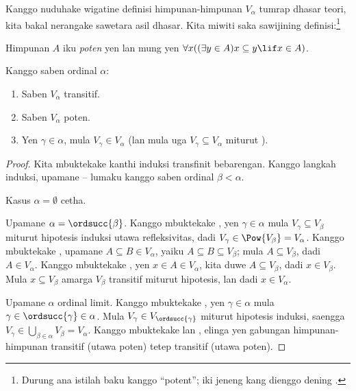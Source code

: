 \documentclass[../../../include/open-logic-section]{subfiles}
\begin{document}

Kanggo nuduhake wigatine definisi himpunan-himpunan
$V_\alpha$ tumrap dhasar teori, kita bakal nerangake
sawetara asil dhasar. Kita miwiti saka sawijining
definisi:\footnote{Durung ana istilah baku kanggo
``potent''; iki jeneng kang dienggo dening
\citet{ButtonLT1}.}
\begin{defn}
	Himpunan $A$ iku \emph{poten} yen lan mung yen
	$\forall x((\exists y \in A)x \subseteq y \lif x \in A)$.
\end{defn}
\begin{lem}
Kanggo saben ordinal $\alpha$:
\begin{enumerate}
	\item{} Saben $V_\alpha$ transitif.
	\item{} Saben $V_\alpha$ poten.
	\item{} Yen $\gamma \in \alpha$,
	mula $V_\gamma \in V_\alpha$ (lan mula uga
	$V_\gamma \subseteq V_\alpha$ miturut
	).
\end{enumerate}
\end{lem}

\begin{proof}
Kita mbuktekake kanthi induksi transfinit bebarengan.
Kanggo langkah induksi, upamane
-- lumaku
kanggo saben ordinal $\beta < \alpha$.

Kasus $\alpha = \emptyset$ cetha.

Upamane $\alpha = \ordsucc{\beta}$. Kanggo mbuktekake
, yen $\gamma \in \alpha$
mula $V_\gamma \subseteq V_\beta$ miturut
hipotesis induksi utawa refleksivitas, dadi
$V_\gamma \in \Pow{V_\beta} = V_\alpha$.
Kanggo mbuktekake , upamane
$A \subseteq B \in V_\alpha$, yaiku
$A \subseteq B \subseteq V_\beta$; mula
$A \subseteq V_\beta$, dadi $A \in V_\alpha$.
Kanggo mbuktekake , yen
$x \in A \in V_\alpha$, kita duwe
$A \subseteq V_\beta$, dadi $x \in V_\beta$.
Mula $x \subseteq V_\beta$ amarga
$V_\beta$ transitif miturut hipotesis,
lan dadi $x \in V_\alpha$.

Upamane $\alpha$ ordinal limit. Kanggo mbuktekake
, yen $\gamma \in \alpha$
mula $\gamma \in \ordsucc{\gamma} \in \alpha$.
Mula $V_\gamma \in V_{\ordsucc{\gamma}}$
miturut hipotesis induksi, saengga
$V_\gamma \in \bigcup_{\beta \in \alpha} V_\beta
= V_\alpha$. Kanggo mbuktekake
 lan ,
elinga yen gabungan himpunan-himpunan transitif
(utawa poten) tetep transitif (utawa poten).
\end{proof}
\end{document}
